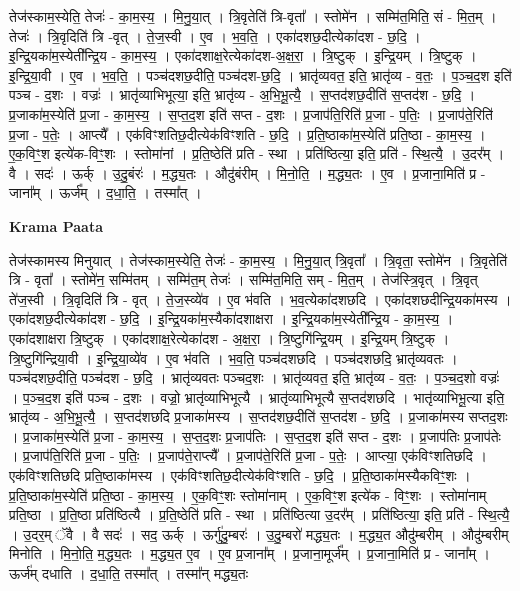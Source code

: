 \documentclass[17pt]{extarticle}
\begin{document}
तेज॑स्काम॒स्येति॒ तेजः॑ - का॒म॒स्य॒ । मि॒नु॒या॒त् । त्रि॒वृतेति॑ त्रि-वृता᳚ । स्तोमे॑न । सम्मि॑त॒मिति॒ सं - मि॒त॒म् । तेजः॑ । त्रि॒वृदिति॑ त्रि -वृत् । ते॒ज॒स्वी । ए॒व । भ॒व॒ति॒ । एका॑दशछ॒दीत्येका॑दश - छ॒दि॒ । इ॒न्द्रि॒यका॑म॒स्येती᳚न्द्रि॒य - का॒म॒स्य॒ । एका॑दशाक्ष॒रेत्येका॑दश-अ॒क्ष॒रा॒ । त्रि॒ष्टुक् । इ॒न्द्रि॒यम् । त्रि॒ष्टुक् । इ॒न्द्रि॒या॒वी । ए॒व । भ॒व॒ति॒ । पञ्च॑दशछ॒दीति॒ पञ्च॑दश-छ॒दि॒ । भ्रातृ॑व्यवत॒ इति॒ भ्रातृ॑व्य - व॒तः॒ । प॒ञ्च॒द॒श इति॑ पञ्च - द॒शः । वज्रः॑ । भ्रातृ॑व्याभिभूत्या॒ इति॒ भ्रातृ॑व्य - अ॒भि॒भू॒त्यै॒ । स॒प्तद॑शछ॒दीति॑ स॒प्तद॑श - छ॒दि॒ । प्र॒जाका॑म॒स्येति॑ प्र॒जा - का॒म॒स्य॒ । स॒प्त॒द॒श इति॑ सप्त - द॒शः । प्र॒जाप॑ति॒रिति॑ प्र॒जा - प॒तिः॒ । प्र॒जाप॑ते॒रिति॑ प्र॒जा - प॒तेः॒ । आप्त्यै᳚ । एक॑विꣳशतिछ॒दीत्येक॑विꣳशति - छ॒दि॒ । प्र॒ति॒ष्ठाका॑म॒स्येति॑ प्रति॒ष्ठा - का॒म॒स्य॒ । ए॒क॒विꣳ॒॒श इत्ये॑क-विꣳ॒॒शः । स्तोमा॑नां । प्र॒ति॒ष्ठेति॑ प्रति - स्था । प्रति॑ष्ठित्या॒ इति॒ प्रति॑ - स्थि॒त्यै॒ । उ॒दर᳚म् । वै । सदः॑ । ऊर्क् । उ॒दु॒बंरः॑ । म॒द्ध्य॒तः । औदु॑बंरीम् । मि॒नो॒ति॒ । म॒द्ध्य॒तः । ए॒व । प्र॒जाना॒मिति॑ प्र - जाना᳚म् । ऊर्ज᳚म् । द॒धा॒ति॒ । तस्मा᳚त् ।  \newline


\textbf{Krama Paata} \newline

तेज॑स्कामस्य मिनुयात् । तेज॑स्काम॒स्येति॒ तेजः॑ - का॒म॒स्य॒ । मि॒नु॒या॒त् त्रि॒वृता᳚ । त्रि॒वृता॒ स्तोमे॑न । त्रि॒वृतेति॑ त्रि - वृता᳚ । स्तोमे॑न॒ सम्मि॑तम् । सम्मि॑त॒म् तेजः॑ । सम्मि॑त॒मिति॒ सम् - मि॒त॒म् । तेज॑स्त्रि॒वृत् । त्रि॒वृत् ते॑ज॒स्वी । त्रि॒वृदिति॑ त्रि - वृत् । ते॒ज॒स्व्ये॑व । ए॒व भ॑वति । भ॒व॒त्येका॑दशछदि । एका॑दशछदीन्द्रि॒यका॑मस्य । एका॑दशछ॒दीत्येका॑दश - छ॒दि॒ । इ॒न्द्रि॒यका॑म॒स्यैका॑दशाक्षरा । इ॒न्द्रि॒यका॑म॒स्येती᳚न्द्रि॒य - का॒म॒स्य॒ । एका॑दशाक्षरा त्रि॒ष्टुक् । एका॑दशाक्ष॒रेत्येका॑दश - अ॒क्ष॒रा॒ । त्रि॒ष्टुगि॑न्द्रि॒यम् । इ॒न्द्रि॒यम् त्रि॒ष्टुक् । त्रि॒ष्टुगि॑न्द्रिया॒वी । इ॒न्द्रि॒या॒व्ये॑व । ए॒व भ॑वति । भ॒व॒ति॒ पञ्च॑दशछदि । पञ्च॑दशछदि॒ भ्रातृ॑व्यवतः । पञ्च॑दशछ॒दीति॒ पञ्च॑दश - छ॒दि॒ । भ्रातृ॑व्यवतः पञ्चद॒शः । भ्रातृ॑व्यवत॒ इति॒ भ्रातृ॑व्य - व॒तः॒ । प॒ञ्च॒द॒शो वज्रः॑ । प॒ञ्च॒द॒श इति॑ पञ्च - द॒शः । वज्रो॒ भ्रातृ॑व्याभिभूत्यै । भ्रातृ॑व्याभिभूत्यै स॒प्तद॑शछदि । भातृ॑व्याभिभू॒त्या इति॒ भ्रातृ॑व्य - अ॒भि॒भू॒त्यै॒ । स॒प्तद॑शछदि प्र॒जाका॑मस्य । स॒प्तद॑शछ॒दीति॑ स॒प्तद॑श - छ॒दि॒ । प्र॒जाका॑मस्य सप्तद॒शः । प्र॒जाका॑म॒स्येति॑ प्र॒जा - का॒म॒स्य॒ । स॒प्त॒द॒शः प्र॒जाप॑तिः । स॒प्त॒द॒श इति॑ सप्त - द॒शः । प्र॒जाप॑तिः प्र॒जाप॑तेः । प्र॒जाप॑ति॒रिति॑ प्र॒जा - प॒तिः॒ । प्र॒जाप॑ते॒राप्त्यै᳚ । प्र॒जाप॑ते॒रिति॑ प्र॒जा - प॒तेः॒ । आप्त्या॒ एक॑विꣳशतिछदि । एक॑विꣳशतिछदि प्रति॒ष्ठाका॑मस्य । एक॑विꣳशतिछ॒दीत्येक॑विꣳशति - छ॒दि॒ । प्र॒ति॒ष्ठाका॑मस्यैकविꣳ॒॒शः । प्र॒ति॒ष्ठाका॑म॒स्येति॑ प्रति॒ष्ठा - का॒म॒स्य॒ । ए॒क॒विꣳ॒॒शः स्तोमा॑नाम् । ए॒क॒विꣳ॒॒श इत्ये॑क - विꣳ॒॒शः । स्तोमा॑नाम् प्रति॒ष्ठा । प्र॒ति॒ष्ठा प्रति॑ष्ठित्यै । प्र॒ति॒ष्ठेति॑ प्रति - स्था । प्रति॑ष्ठित्या उ॒दर᳚म् । प्रति॑ष्ठित्या॒ इति॒ प्रति॑ - स्थि॒त्यै॒ । उ॒दर॒म् ॅवै । वै सदः॑ । सद॒ ऊर्क् । ऊर्गु॑दु॒म्बरः॑ । उ॒दु॒म्बरो॑ मद्ध्य॒तः । म॒द्ध्य॒त औदु॑म्बरीम् । औदु॑म्बरीम् मिनोति । मि॒नो॒ति॒ म॒द्ध्य॒तः । म॒द्ध्य॒त ए॒व । ए॒व प्र॒जाना᳚म् । प्र॒जाना॒मूर्ज᳚म् । प्र॒जाना॒मिति॑ प्र - जाना᳚म् । ऊर्ज॑म् दधाति । द॒धा॒ति॒ तस्मा᳚त् । तस्मा᳚न् मद्ध्य॒तः \newline
\end{document}
